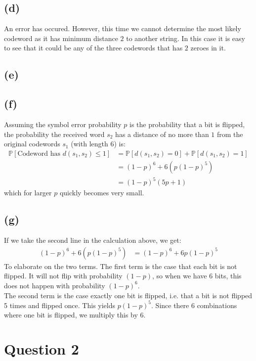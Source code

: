 \documentclass[a4paper, fleqn]{article}
\begin{document}
\subsection{(d)}
An error has occured. However, this time we cannot determine the most likely codeword as
it has minimum distance $2$ to another string. In this case it is easy to see that it
could be any of the three codewords that has $2$ zeroes in it.

\subsection{(e)}

\subsection{(f)}
Assuming the symbol error probability $p$ is the probability that a bit is flipped, the
probability the received word $s_2$ has a distance of no more than $1$ from the original
codewords $s_1$ (with length $6$) is:
\begin{align*}
  \mathbb{P}[\mbox{Codeword has $d(s_1, s_2)\leq 1$}] &=
  \mathbb{P}[d(s_1,s_2)=0]+\mathbb{P}[d(s_1,s_2)=1] \\
  &= (1-p)^6 + 6\left(p(1-p)^5\right) \\
  &= (1-p)^5(5p+1)
\end{align*}
which for larger $p$ quickly becomes very small.

\subsection{(g)}
If we take the second line in the calculation above, we get:
\begin{align*}
  (1-p)^6+6\left( p(1-p)^5\right) &=(1-p)^6+6p(1-p)^5
\end{align*}
To elaborate on the two terms. The first term is the case that each bit is not flipped.
It will not flip with probability $(1-p)$, so when we have $6$ bits, this does not happen
with probability $(1-p)^6$. \\
The second term is the case exactly one bit is flipped, i.e. that a bit is not flipped 5
times and flipped once. This yields $p(1-p)^5$. Since there $6$ combinations where one
bit is flipped, we multiply this by $6$.

\section{Question 2}
\end{document}

